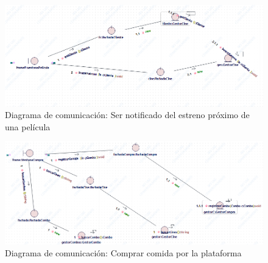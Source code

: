 \begin{figure}[h!]
\centering
\includegraphics[width=1\linewidth]{diseno/requerimientos/imgs/EstrenoCom}
	\caption{Diagrama de comunicación: Ser notificado del estreno próximo de una película}
\end{figure}
\begin{figure}[h!]
\centering
\includegraphics[width=1\linewidth]{diseno/requerimientos/imgs/CompraCombosCom}
	\caption{Diagrama de comunicación: Comprar comida por la plataforma}
\end{figure}

